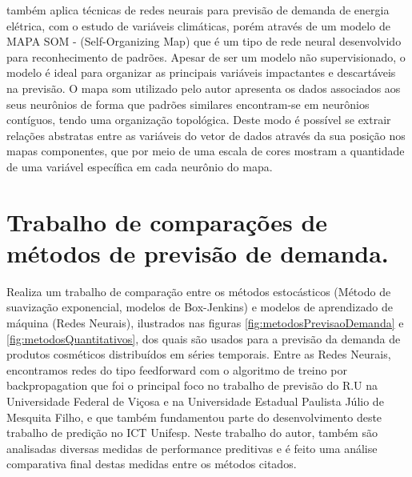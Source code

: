         também aplica técnicas de redes neurais para previsão de demanda de energia elétrica, com o estudo de variáveis climáticas, porém através de um modelo de MAPA SOM - (Self-Organizing Map) que é um tipo de rede neural desenvolvido para reconhecimento de padrões. Apesar de ser um modelo não supervisionado, o modelo é ideal para organizar as principais variáveis impactantes e descartáveis na previsão. O mapa som utilizado pelo autor apresenta os dados associados aos seus neurônios de forma que padrões similares encontram-se em neurônios contíguos, tendo uma organização topológica. Deste modo é possível se extrair relações abstratas entre as variáveis do vetor de dados através da sua posição nos mapas componentes, que por meio de uma escala de cores mostram a quantidade de uma variável específica em cada neurônio do mapa.
       
       \section{Trabalho de comparações de métodos de previsão de demanda.}
         Realiza um trabalho de comparação entre os métodos estocásticos (Método de suavização exponencial, modelos de Box-Jenkins) e modelos de aprendizado de máquina (Redes Neurais), ilustrados nas figuras \ref{fig:metodosPrevisaoDemanda} e \ref{fig:metodosQuantitativos}, dos quais são usados para a previsão da demanda de produtos cosméticos distribuídos em séries temporais. Entre as Redes Neurais, encontramos redes do tipo feedforward com o algoritmo de treino por backpropagation que foi o principal foco no trabalho de previsão do R.U na Universidade Federal de Viçosa e na Universidade Estadual Paulista Júlio de Mesquita Filho, e que também fundamentou parte do desenvolvimento deste trabalho de predição no ICT Unifesp. Neste trabalho do autor, também são analisadas diversas medidas de performance preditivas e é feito uma análise comparativa final destas medidas entre os métodos citados.